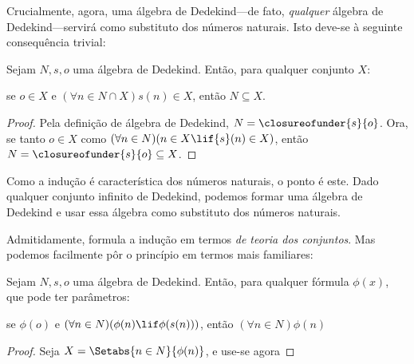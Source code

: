 \documentclass[../../../include/open-logic-section]{subfiles}
\begin{document}

Crucialmente, agora, uma álgebra de Dedekind---de fato, \emph{qualquer}
álgebra de Dedekind---servirá como substituto dos números naturais. Isto
deve-se à seguinte consequência trivial:

\begin{thm}
Sejam $N, s, o$ uma álgebra de Dedekind. Então, para qualquer conjunto $X$:
	\begin{center}
		se $o \in X$ e $(\forall {n} \in N \cap X){s}({n}) \in X$, {então} $N \subseteq X$.
	\end{center}
\end{thm}

\begin{proof}
Pela definição de álgebra de Dedekind, $N = \closureofunder{s}{o}$.
Ora, se tanto ${o} \in X$ como $(\forall {n} \in N)(n \in X \lif
{s}({n}) \in X)$, então $N = \closureofunder{s}{o} \subseteq X$.
\end{proof}

Como a indução é característica dos números naturais, o ponto é este.
Dado qualquer conjunto infinito de Dedekind, podemos formar uma álgebra de
Dedekind e usar essa álgebra como substituto dos números naturais.

Admitidamente,  formula a indução em
termos \emph{de teoria dos conjuntos}. Mas podemos facilmente pôr o
princípio em termos mais familiares:

\begin{cor}
Sejam $N, s, o$ uma álgebra de Dedekind. Então, para qualquer fórmula
$\phi(x)$, que pode ter parâmetros:
\begin{center}
	se $\phi(o)$ e $(\forall {n} \in N)(\phi(n)\lif
	\phi({s}({n})))$, {então} $(\forall n \in N)\phi(n)$
\end{center}
\end{cor}

\begin{proof}
Seja $X = \Setabs{n \in N}{\phi(n)}$, e use-se agora
\end{proof}
\end{document}
